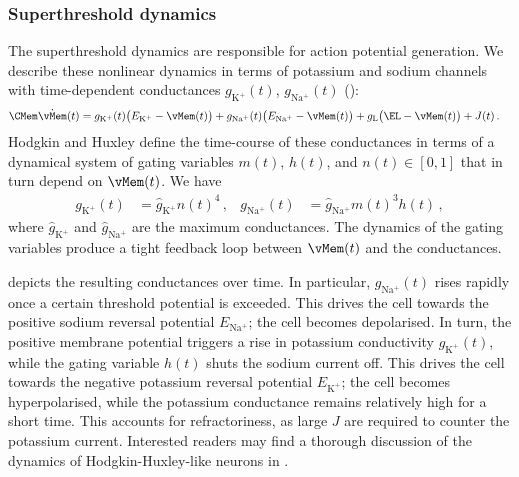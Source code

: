 \subsubsection{Superthreshold dynamics}
The superthreshold dynamics are responsible for action potential generation.
We describe these nonlinear dynamics in terms of potassium and sodium channels with time-dependent conductances $g_\mathrm{K^+}(t)$, $g_\mathrm{Na^+}(t)$ ():
\begin{align*}
	\CMem \dot\vMem(t) &=
		  g_\mathrm{K^+}(t) \bigl(E_\mathrm{K^+} - \vMem(t)\bigr)
		+ g_\mathrm{Na^+}(t) \bigl(E_\mathrm{Na^+} - \vMem(t)\bigr)
		+ g_\mathrm{L} \bigl(\EL - \vMem(t)\bigr) + J(t) \,.
\end{align*}
Hodgkin and Huxley define the time-course of these conductances in terms of a dynamical system of gating variables $m(t)$, $h(t)$, and $n(t) \in [0, 1]$ that in turn depend on $\vMem(t)$.
We have
\begin{align*}
	g_\mathrm{K^+}(t) &= \hat g_\mathrm{K^+} n(t)^4 \,, &
	g_\mathrm{Na^+}(t) &= \hat g_\mathrm{Na^+} m(t)^3 h(t) \,,
\end{align*}
where $\hat g_\mathrm{K^+}$ and $\hat g_\mathrm{Na^+}$ are the maximum conductances.
The dynamics of the gating variables%
produce a tight feedback loop between $\vMem(t)$ and the conductances.

 depicts the resulting conductances over time.
In particular, $g_\mathrm{Na^+}(t)$ rises rapidly once a certain threshold potential is exceeded.
This drives the cell towards the positive sodium reversal potential $E_\mathrm{Na^+}$; the cell becomes depolarised.
In turn, the positive membrane potential triggers a rise in potassium conductivity $g_\mathrm{K^+}(t)$, while the gating variable $h(t)$ shuts the sodium current off. This drives the cell towards the negative potassium reversal potential $E_\mathrm{K^+}$; the cell becomes hyperpolarised, while the potassium conductance remains relatively high for a short time.
This accounts for refractoriness, as large $J$ are required to counter the potassium current.
Interested readers may find a thorough discussion of the dynamics of Hodgkin-Huxley-like neurons in \citet{izhikevich2007dynamical}.

